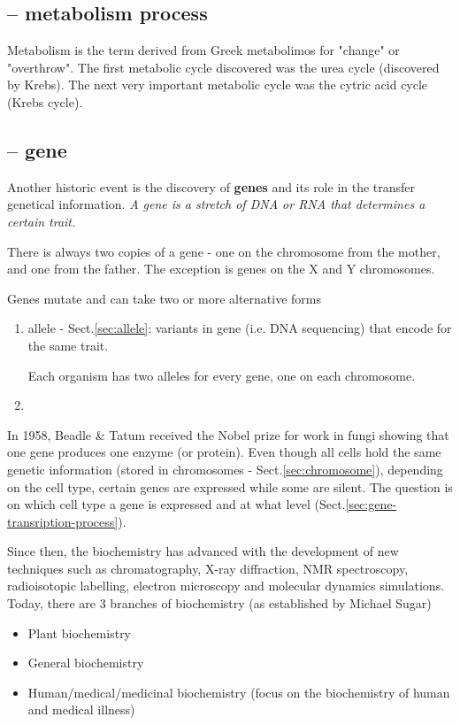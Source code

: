 \subsection{-- metabolism process}

Metabolism is the term derived from Greek metabolimos for "change" or
"overthrow". The first metabolic cycle discovered was the urea cycle (discovered
by Krebs). The next very important metabolic cycle was the cytric acid cycle
(Krebs cycle).

\subsection{-- gene}
\label{sec:gene-history}

Another historic event is the discovery of {\bf genes} and its role in the
transfer genetical information. {\it A gene is a stretch of DNA or RNA that
determines a certain trait.} 

There is always two copies of a gene - one on the chromosome from the mother,
and one from the father. The exception is genes on the X and Y chromosomes.

Genes mutate and can take two or more alternative
forms
\begin{enumerate}
  \item allele - Sect.\ref{sec:allele}: variants in gene (i.e. DNA sequencing)
  that encode for the same trait.

Each organism has two alleles for every gene, one on each chromosome.


  \item
\end{enumerate}

In 1958, Beadle \& Tatum received the Nobel prize for work in fungi showing that
one gene produces one enzyme (or protein). Even though all cells hold the
same genetic information (stored in chromosomes - Sect.\ref{sec:chromosome}),
depending on the cell type, certain genes are expressed while some are
silent. The question is on which cell type a gene is expressed and at what
level (Sect.\ref{sec:gene-transription-process}).

Since then, the biochemistry has advanced with the development of new techniques
such as chromatography, X-ray diffraction, NMR spectroscopy, radioisotopic
labelling, electron microscopy and molecular dynamics simulations.  Today, there
are 3 branches of biochemistry (as established by Michael Sugar)

\begin{itemize}
  \item Plant biochemistry
  \item General biochemistry
  \item Human/medical/medicinal biochemistry (focus on the biochemistry of human and medical illness)
\end{itemize}

